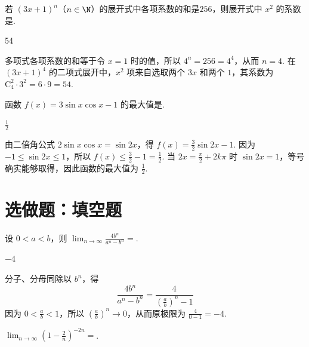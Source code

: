 \begin{problem}
若 \((3x+1)^{n}\)（\(n\in \N\)）的展开式中各项系数的和是\(256\)，则展开式中 \(x^{2}\) 的系数是\fillinblank{}.
\end{problem}

\begin{answer}
54
\end{answer}

\begin{solution}
多项式各项系数的和等于令 \(x=1\) 时的值，所以 \(4^n=256=4^4\)，从而 \(n=4\). 在 \((3x+1)^4\) 的二项式展开中，\(x^2\) 项来自选取两个 \(3x\) 和两个 \(1\)，其系数为 \(\mathrm C_4^2\cdot3^2=6\cdot9=54\).
\end{solution}

\begin{problem}
函数 \(f(x)=3\sin x\cos x-1\) 的最大值是\fillinblank{}.
\end{problem}

\begin{answer}
\(\frac{1}{2}\)
\end{answer}

\begin{solution}
由二倍角公式 \(2\sin x\cos x=\sin 2x\)，得 \(f(x)=\frac32\sin 2x-1\). 因为 \(-1\leqslant\sin 2x\leqslant1\)，所以 \(f(x)\leqslant\frac32-1=\frac12\). 当 \(2x=\frac\pi2+2k\pi\) 时 \(\sin 2x=1\)，等号确实能够取得，因此函数的最大值为 \(\frac12\).
\end{solution}

\section{选做题：填空题}

\begin{problem}[A]
设 \(0 < a < b\)，则 \(\displaystyle\lim_{n \to \infty} \frac{4b^n}{a^n-b^n}=\)\fillinblank{}.
\end{problem}

\begin{answer}
\(-4\)
\end{answer}

\begin{solution}
分子、分母同除以 \(b^n\)，得
\[
\frac{4b^n}{a^n-b^n}=\frac{4}{\left(\frac ab\right)^n-1}
\]
因为 \(0<\frac ab<1\)，所以 \(\left(\frac ab\right)^n\to0\)，从而原极限为 \(\frac4{0-1}=-4\).
\end{solution}

\reuseproblemnumber
\begin{problem}[B]
\(\displaystyle\lim_{n\to\infty}\left(1-\frac{2}{n}\right)^{-2n}=\)\fillinblank{}.
\end{problem}

